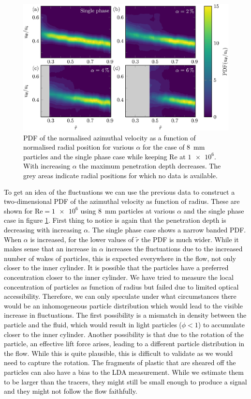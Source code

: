 \documentclass{jfm}
\newcommand\rey{\text{Re}}
\newcommand{\red}[1]{\textcolor{black}{#1}}
\begin{document}
\begin{figure}
\centering%
\includegraphics{Figures/figure8.eps}%
\caption{%
\label{fig:heatmap}
\red{
PDF of the normalised azimuthal velocity as a function of normalised radial
position for various $\alpha$ for the case of \SI{8}{\milli\metre} particles
and the single phase case while keeping $\rey$ at $\num{1e6}$. With increasing
$\alpha$ the maximum penetration depth decreases. The grey areas indicate
radial positions for which no data is available.
}}
\end{figure}

\red{
To get an idea of the fluctuations we can use the previous data to construct a
two-dimensional PDF of the azimuthal velocity as function of radius. These are
shown for $\rey = \num{1e6}$ using \SI{8}{\milli\metre} particles at various
$\alpha$ and the single phase case in figure \ref{fig:heatmap}.  First thing
to notice is again that the penetration depth is decreasing with increasing
$\alpha$.  The single phase case shows a narrow banded PDF. When $\alpha$ is
increased, for the lower values of $\tilde{r}$ the PDF is much wider.  While
it makes sense that an increase in $\alpha$ increases the fluctuations due to
the increased number of wakes of particles, this is expected everywhere in the
flow, not only closer to the inner cylinder.  It is possible that the
particles have a preferred concentration closer to the inner cylinder.  We
have tried to measure the local concentration of particles as function of
radius but failed due to limited optical accessibility.  Therefore, we can
only speculate under what circumstances there would be an inhomogeneous
particle distribution which would lead to the visible increase in
fluctuations.  The first possibility is a mismatch in density between the
particle and the fluid, which would result in light particles ($\phi < 1$) to
accumulate closer to the inner cylinder.  Another possibility is that due to
the rotation of the particle, an effective lift force arises, leading to a
different particle distribution in the flow. While this is quite plausible,
this is difficult to validate as we would need to capture the rotation.  The
fragments of plastic that are sheared off the particles can also have a bias
to the LDA measurement. While we estimate them to be larger than the tracers,
they might still be small enough to produce a signal and they might not follow
the flow faithfully.
}
\end{document}
